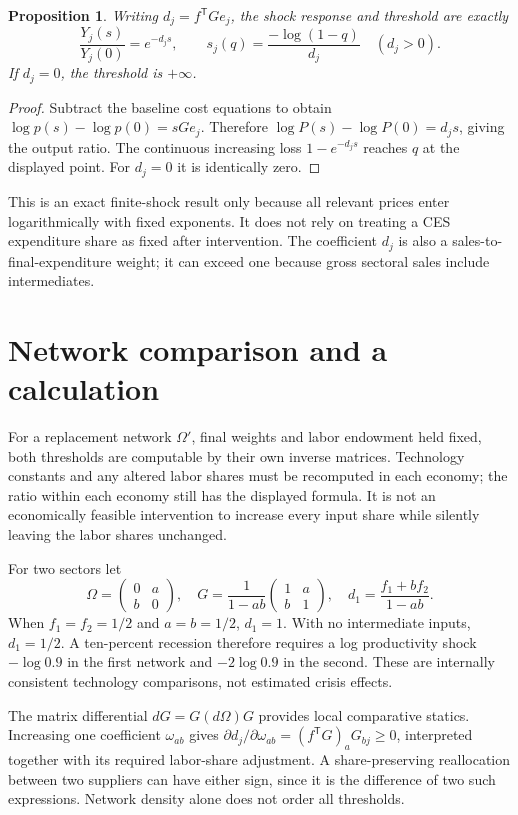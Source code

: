 \documentclass[11pt]{article}
\newtheorem{proposition}{Proposition}
\begin{document}
\begin{proposition}
Writing $d_j=f^{\mathsf T}Ge_j$, the shock response and threshold are exactly
\[
 \frac{Y_j(s)}{Y_j(0)}=e^{-d_js},\qquad
 s_j(q)=\frac{-\log(1-q)}{d_j}\quad(d_j>0).
\]
If $d_j=0$, the threshold is $+\infty$.
\end{proposition}
\begin{proof}
Subtract the baseline cost equations to obtain $\log p(s)-\log p(0)=sGe_j$. Therefore $\log P(s)-\log P(0)=d_js$, giving the output ratio. The continuous increasing loss $1-e^{-d_js}$ reaches $q$ at the displayed point. For $d_j=0$ it is identically zero.
\end{proof}
This is an exact finite-shock result only because all relevant prices enter logarithmically with fixed exponents. It does not rely on treating a CES expenditure share as fixed after intervention. The coefficient $d_j$ is also a sales-to-final-expenditure weight; it can exceed one because gross sectoral sales include intermediates.

\section{Network comparison and a calculation}
For a replacement network $\Omega'$, final weights and labor endowment held fixed, both thresholds are computable by their own inverse matrices. Technology constants and any altered labor shares must be recomputed in each economy; the ratio within each economy still has the displayed formula. It is not an economically feasible intervention to increase every input share while silently leaving the labor shares unchanged.

For two sectors let
\[
 \Omega=\begin{pmatrix}0&a\\b&0\end{pmatrix},\quad
 G=\frac1{1-ab}\begin{pmatrix}1&a\\b&1\end{pmatrix},\quad
 d_1=\frac{f_1+bf_2}{1-ab}.
\]
When $f_1=f_2=1/2$ and $a=b=1/2$, $d_1=1$. With no intermediate inputs, $d_1=1/2$. A ten-percent recession therefore requires a log productivity shock $-\log0.9$ in the first network and $-2\log0.9$ in the second. These are internally consistent technology comparisons, not estimated crisis effects.

The matrix differential $dG=G(d\Omega)G$ provides local comparative statics. Increasing one coefficient $\omega_{ab}$ gives $\partial d_j/\partial\omega_{ab}=(f^{\mathsf T}G)_aG_{bj}\geq0$, interpreted together with its required labor-share adjustment. A share-preserving reallocation between two suppliers can have either sign, since it is the difference of two such expressions. Network density alone does not order all thresholds.
\end{document}
